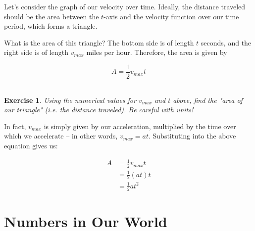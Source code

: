 \documentclass{book}
\newtheorem{exercise}{\\ \bf Exercise}
\begin{document}
Let's consider the graph of our velocity over time. Ideally, the distance traveled should be the area between the $t$-axis and the velocity function over our time period, which forms a triangle. 


What is the area of this triangle? The bottom side is of length $t$ seconds, and the right side is of length $v_{max}$ miles per hour. Therefore, the area is given by 

\begin{equation}
A = \frac{1}{2} v_{max} t
\end{equation}


\begin{exercise}
\label{const-velocity-numerical}
Using the numerical values for $v_{max}$ and $t$ above, find the "area of our triangle" (i.e. the distance traveled). Be careful with units!
\end{exercise}

In fact, $v_{max}$ is simply given by our acceleration, multiplied by the time over which we accelerate -- in other words, $v_{max} = at$. Substituting into the above equation gives us:

\begin{align*}
A &= \frac{1}{2} v_{max} t \\
&= \frac{1}{2} (a t) t \\
&= \frac{1}{2} a t^2
\end{align*}




















\section{Numbers in Our World}

\subsection{}
\end{document}
